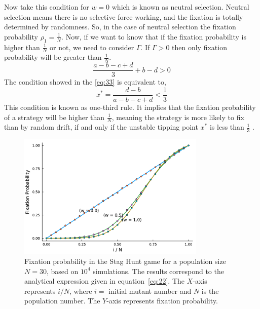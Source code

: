 \documentclass{article}
\begin{document}
Now take this condition for $w=0$ which is known as neutral selection.
Neutral selection means there is no selective force working, and the fixation is totally determined by randomness.
So, in the case of neutral selection the fixation probability $\rho_1 = \frac{1}{N}$.
Now, if we want to know that if the fixation probability is higher than $\frac{1}{N}$ or not, we need to consider $\Gamma$.
If $\Gamma>0$ then only fixation probability will be greater than $\frac{1}{N}$.
\begin{equation}
\frac{a-b-c+d}{3}+ b-d > 0 \label{eq:33}
\end{equation}
The condition showed in the \eqref{eq:33} is equivalent to,
\begin{equation}
x^* = \frac{d-b}{a-b-c+d}<\frac{1}{3} \label{eq:34}
\end{equation}
This condition is known as one-third rule.
It implies that the fixation probability of a strategy will be higher than $\frac{1}{N}$, meaning the strategy is more likely to fix than by random drift, if and only if the unstable tipping point $x^*$ is less than $\frac{1}{3}$ \citep{Ohtsuki2007}.
\begin{figure}[H]
    \centering
    \includegraphics[width=0.8\textwidth]{SH_FP_SIM.pdf}
    \caption{Fixation probability in the Stag Hunt game for a population size $N = 30$, based on $10^4$ simulations. The results correspond to the analytical expression given in equation~\eqref{eq:22}. The $X$-axis represents $i/N$, where $i=$ initial mutant number and $N$ is the population number. The $Y$-axis represents fixation probability.}
    \label{fig:5}
\end{figure}
\end{document}
